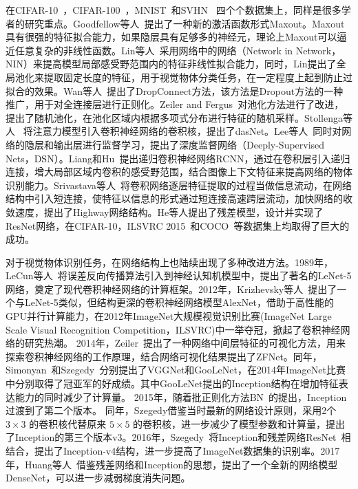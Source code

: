 在CIFAR-10~\cite{krizhevsky2009learning}，CIFAR-100~\cite{krizhevsky2009learning}，MNIST~\cite{lecun1998gradient}和SVHN~\cite{netzer2011reading} 四个个数据集上，同样是很多学者的研究重点。Goodfellow等人~\cite{goodfellow2013maxout}提出了一种新的激活函数形式Maxout。Maxout具有很强的特征拟合能力，如果隐层具有足够多的神经元，理论上Maxout可以逼近任意复杂的非线性函数。Lin等人~\cite{DBLP:journals/corr/LinCY13}采用网络中的网络（Network in Network，NIN）来提高模型局部感受野范围内的特征非线性拟合能力，同时，Lin提出了全局池化来提取固定长度的特征，用于视觉物体分类任务，在一定程度上起到防止过拟合的效果。Wan等人~\cite{wan2013regularization}提出了DropConnect方法，该方法是Dropout方法的一种推广，用于对全连接层进行正则化。Zeiler and Fergus~\cite{zeiler2013stochastic}对池化方法进行了改进，提出了随机池化，在池化区域内根据多项式分布进行特征的随机采样。Stollenga等人~\cite{stollenga2014deep} 将注意力模型引入卷积神经网络的卷积核，提出了dasNet。Lee等人~\cite{lee2014deeply}同时对网络的隐层和输出层进行监督学习，提出了深度监督网络（Deeply-Supervised Nets，DSN）。Liang和Hu~\cite{liang2015recurrent}提出递归卷积神经网络RCNN，通过在卷积层引入递归连接，增大局部区域内卷积的感受野范围，结合图像上下文特征来提高网络的物体识别能力。Srivastava等人~\cite{srivastava2015training}将卷积网络逐层特征提取的过程当做信息流动，在网络结构中引入短连接，使特征以信息的形式通过短连接高速跨层流动，加快网络的收敛速度，提出了Highway网络结构。He等人\cite{he2015deep}提出了残差模型，设计并实现了ResNet网络，在CIFAR-10，ILSVRC 2015~\cite{everingham2010pascal}和COCO~\cite{lin2014microsoft}等数据集上均取得了巨大的成功。

对于视觉物体识别任务，在网络结构上也陆续出现了多种改进方法。1989年，LeCun等人~\cite{lecun1989backpropagation,le1990handwritten}将误差反向传播算法引入到神经认知机模型中，提出了著名的LeNet-5网络，奠定了现代卷积神经网络的计算框架。2012年，Krizhevsky等人~\cite{krizhevsky2012imagenet}提出了一个与LeNet-5类似，但结构更深的卷积神经网络模型AlexNet，借助于高性能的GPU并行计算能力，在2012年ImageNet大规模视觉识别比赛(ImageNet Large Scale Visual Recognition Competition，ILSVRC)中一举夺冠，掀起了卷积神经网络的研究热潮。
2014年，Zeiler~\cite{zeiler2014visualizing}提出了一种网络中间层特征的可视化方法，用来探索卷积神经网络的工作原理，结合网络可视化结果提出了ZFNet。同年，Simonyan~\cite{simonyan2014very}和Szegedy~\cite{szegedy2014going}分别提出了VGGNet和GooLeNet，在2014年ImageNet比赛中分别取得了冠亚军的好成绩。其中GooLeNet提出的Inception结构在增加特征表达能力的同时减少了计算量。
2015年，随着批正则化方法BN~\cite{ioffe2015batch}的提出，Inception过渡到了第二个版本。
同年，Szegedy借鉴当时最新的网络设计原则，采用2个 $3\times3$ 的卷积核代替原来 $5\times5$ 的卷积核，进一步减少了模型参数和计算量，提出了Inception的第三个版本v3。2016年，Szegedy~\cite{szegedy2016inception}将Inception和残差网络ResNet~\cite{he2015deep}相结合，提出了Inception-v4结构，进一步提高了ImageNet数据集的识别率。2017年，Huang等人~\cite{huang2016densely}借鉴残差网络和Inception的思想，提出了一个全新的网络模型DenseNet，可以进一步减弱梯度消失问题。

